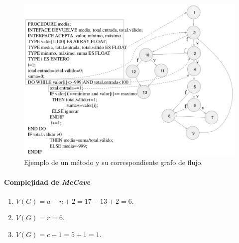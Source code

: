 \begin{figure}[H]
    \centering
    \includegraphics[width=0.9\linewidth]{Resources/Tema6/Ejemplo_CalculoComplejidadCiclomatica.png}
    \caption{Ejemplo de un método y su correspondiente grafo de flujo.}
\end{figure}

\paragraph{Complejidad de \textit{McCave}}

\begin{enumerate}
    \item $V (G) = a-n+2 = 17-13+2 = 6$.
    \item $V (G) = r = 6$.
    \item $V (G) = c+1 = 5+1 = 1$.
\end{enumerate}